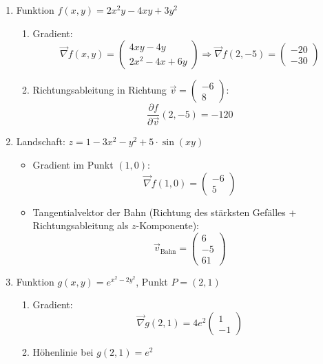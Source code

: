 \begin{enumerate}
	\item Funktion \( f(x, y) = 2x^2 y - 4xy + 3y^2 \)
	      \begin{enumerate}
		      \item Gradient:
		            \[
			            \vec{\nabla} f(x, y) =
			            \begin{pmatrix}
				            4x y - 4y \\
				            2x^2 - 4x + 6y
			            \end{pmatrix}
			            \Rightarrow
			            \vec{\nabla} f(2, -5) =
			            \begin{pmatrix}
				            -20 \\
				            -30
			            \end{pmatrix}
		            \]
		      \item Richtungsableitung in Richtung \( \vec{v} = \begin{pmatrix} -6 \\ 8 \end{pmatrix} \):
		            \[
			            \frac{\partial f}{\partial \vec{v}}(2, -5) = -120
		            \]
	      \end{enumerate}

	\item Landschaft: \( z = 1 - 3x^2 - y^2 + 5 \cdot \sin(xy) \)
	      \begin{itemize}
		      \item Gradient im Punkt \( (1, 0) \):
		            \[
			            \vec{\nabla} f(1, 0) = \begin{pmatrix} -6 \\ 5 \end{pmatrix}
		            \]
		      \item Tangentialvektor der Bahn (Richtung des stärksten Gefälles + Richtungsableitung als $z$-Komponente):
		            \[
			            \vec{v}_{\text{Bahn}} = \begin{pmatrix} 6 \\ -5 \\ 61 \end{pmatrix}
		            \]
	      \end{itemize}

	\item Funktion \( g(x, y) = e^{x^2 - 2y^2} \), Punkt \( P = (2, 1) \)
	      \begin{enumerate}
		      \item Gradient:
		            \[
			            \vec{\nabla} g(2, 1) = 4e^2
			            \begin{pmatrix}
				            1 \\
				            -1
			            \end{pmatrix}
		            \]
		      \item Höhenlinie bei \( g(2, 1) = e^2 \)


\end{enumerate}
\end{enumerate}
